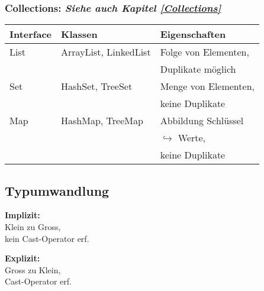 {    \subsubsection{Collections: \textit{Siehe auch Kapitel \ref{Collections}}}
        \begin{center}
            \begin{tabular}{lll}
                \rowcolor[RGB]{239,239,239} 
                \textbf{Interface} & \textbf{Klassen} & \textbf{Eigenschaften} \\ \hline
                List & ArrayList, LinkedList & Folge von Elementen, \\
                    &                       & Duplikate möglich\\
                \hline
                Set  & HashSet, TreeSet & Menge von Elementen, \\
                    &                       & keine Duplikate \\
                \hline
                Map  & HashMap, TreeMap & Abbildung Schlüssel \\
                    &                  & $\hookrightarrow$ Werte, \\
                    &                  & keine Duplikate \\
            \end{tabular}
        \end{center}
        \vspace{-0.6cm}

\subsection{Typumwandlung}
    \begin{minipage}{0.4\columnwidth}
        \textbf{Implizit:}\\
        Klein zu Gross,\\
        kein Cast-Operator erf.\\
        
    \end{minipage}
    \begin{minipage}{0.55\columnwidth}
        \textbf{Explizit:}\\
        Gross zu Klein,\\
        Cast-Operator erf.\\
        
    \end{minipage}
    \vspace{-0.3cm} 
}
